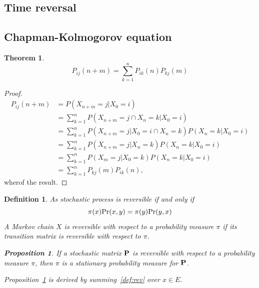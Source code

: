 \documentclass[12pt,a4paper]{article}
\newtheorem{theorem}{Theorem}
\newtheorem{proposition}{Proposition}
\newtheorem{definition}{Definition}
\newcommand{\bP}{\bold P}
\begin{document}
\subsection{Time reversal}

\subsection{Chapman-Kolmogorov equation}
\begin{theorem}
	$$
	P_{ij}(n+m) = \sum_{k=1}^n P_{ik}(n) P_{kj}(m)
	$$
\end{theorem}
\begin{proof}
	\begin{equation}
		\begin{alignedat}{2}
			P_{ij}(n+m) &= P(X_{n+m} = j|X_0 = i)\\
			&= \sum_{k=1}^n P(X_{n+m} = j \cap  X_n = k|X_0 = i)\\
			&= \sum_{k=1}^n P(X_{n+m} = j |X_0 = i\cap  X_n = k) P(X_n = k |X_0 = i)\\
			&= \sum_{k=1}^n P(X_{n+m} = j | X_n = k) P(X_n = k |X_0 = i)\\
			&= \sum_{k=1}^n P(X_{m} = j | X_0 = k) P(X_n = k |X_0 = i)\\
			&= \sum_{k=1}^n P_{kj}(m) P_{ik}(n), 
		\end{alignedat}
	\end{equation}
	wherof the result.
\end{proof}

\begin{definition}
	As stochastic process is reversible if and only if 
	\begin{equation}\label{def:rev}
		\pi(x){\rm Pr}(x, y) = \pi(y){\rm Pr}(y, x)
	\end{equation}
	A Markov chain $X$ is reversible with respect to a probability measure $\pi$ if its transition matrix is reversible with respect to $\pi$.
	\begin{proposition}\label{prop:rev}
		If a stochastic matrix $\bP$ is reversible with respect to a probability measure $\pi$, then $\pi$ is a stationary probability measure for $\bP$.
	\end{proposition}
	Proposition~\ref{prop:rev} is derived by summing~\eqref{def:rev} over $x \in E$.
	
\end{definition}

\newpage
\end{document}
